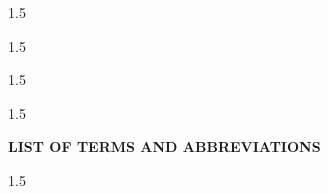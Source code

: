 \documentclass[12pt,oneside,a4paper,semicolon]{book} %
\begin{document}


\newpage
\begin{spacing}{1.5}


\newpage

\newpage

\newpage
{}

\newpage
\end{spacing}
\newpage
\begin{spacing}{1.5}
	\tableofcontents	
\end{spacing}
\newpage
\let\origaddvspace\addvspace
\renewcommand{\addvspace}[1]{}
\begin{spacing}{1.5}
	\setcounter{lofdepth}{2} \listoffigures
\end{spacing}
\newpage
\begin{spacing}{1.5}
	\setcounter{lotdepth}{2} \listoftables 	
\end{spacing}

\clearpage


\begin{center}
    \textbf{LIST OF TERMS AND ABBREVIATIONS}
\end{center}
\vspace{0.5cm}

\printglossary%

\mainmatter


\begin{spacing}{1.5}
	















\end{spacing}
%
% 

\newpage 



% 	
\end{document}
